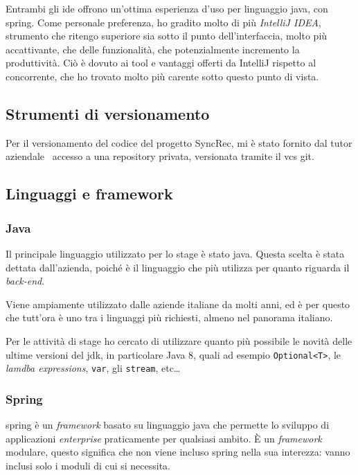 Entrambi gli \acrshort{ide} offrono un'ottima esperienza d'uso per linguaggio \gls{java}, con \gls{spring}.
Come personale preferenza, ho gradito molto di più \textit{IntelliJ IDEA}, strumento che ritengo superiore sia sotto il punto dell'interfaccia, molto più accattivante, che delle funzionalità, che potenzialmente incremento la produttività. Ciò è dovuto ai tool e vantaggi offerti da IntelliJ rispetto al concorrente, che ho trovato molto più carente sotto questo punto di vista.

\subsection{Strumenti di versionamento}

Per il versionamento del codice del progetto SyncRec, mi è stato fornito dal tutor aziendale \fabio\ accesso a una \gls{repository} privata, versionata tramite il \gls{vcs} \gls{git}.

\subsection{Linguaggi e framework}

\subsubsection{Java} Il principale linguaggio utilizzato per lo stage è stato \gls{java}. Questa scelta è stata dettata dall'azienda, poiché è il linguaggio che più utilizza per quanto riguarda il \textit{back-end}.

Viene ampiamente utilizzato dalle aziende italiane da molti anni, ed è per questo che tutt'ora è uno tra i linguaggi più richiesti, almeno nel panorama italiano.

Per le attività di stage ho cercato di utilizzare quanto più possibile le novità delle ultime versioni del \gls{jdk}, in particolare Java 8, quali ad esempio \texttt{Optional<T>}, le \textit{lamdba expressions}, \texttt{var}, gli \texttt{stream}, etc\dots

\subsubsection{Spring}

\gls{spring} è un \textit{framework} basato su linguaggio \gls{java} che permette lo sviluppo di applicazioni \textit{enterprise} praticamente per qualsiasi ambito.
È un \textit{framework} modulare, questo significa che non viene incluso \gls{spring} nella sua interezza: vanno inclusi solo i moduli di cui si necessita.

